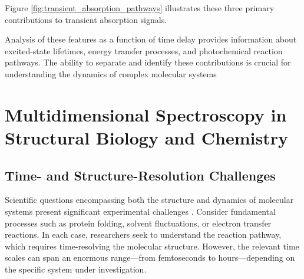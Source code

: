 
\noindent Figure \ref{fig:transient_absorption_pathways} illustrates these three primary contributions to transient absorption signals.

\noindent Analysis of these features as a function of time delay provides information about excited-state lifetimes, energy transfer processes, and photochemical reaction pathways. The ability to separate and identify these contributions is crucial for understanding the dynamics of complex molecular systems %


\section{Multidimensional Spectroscopy in Structural Biology and Chemistry}
\label{sec:multidimensional_applications}

\subsection{Time- and Structure-Resolution Challenges}
\label{subsec:time_structure_challenges}

\noindent Scientific questions encompassing both the structure and dynamics of molecular systems present significant experimental challenges \cite{HammZanni2011ConceptsMethods2D}. Consider fundamental processes such as protein folding, solvent fluctuations, or electron transfer reactions. In each case, researchers seek to understand the reaction pathway, which requires time-resolving the molecular structure. However, the relevant time scales can span an enormous range—from femtoseconds to hours—depending on the specific system under investigation.

